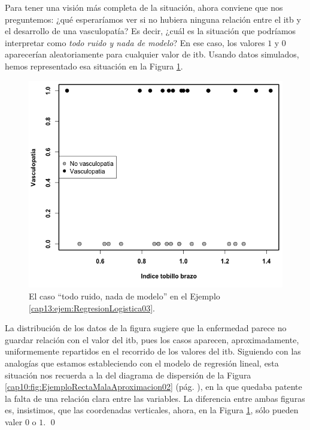 \begin{ejemplo}
Para tener una visión más completa de la situación, ahora conviene que nos preguntemos: ¿qué esperaríamos ver si no hubiera ninguna relación entre el itb y el desarrollo de una vasculopatía? Es decir, ¿cuál es la situación que podríamos interpretar como {\em todo ruido y nada de modelo}? En ese caso, los valores $1$ y $0$ aparecerían aleatoriamente para cualquier valor de itb. Usando datos simulados, hemos representado esa situación en la Figura \ref{cap13:fig:RegresionLogisticaNoRelacion}.
\begin{figure}[h!]
\begin{center}
    \includegraphics[width=13cm]{../fig/Cap13-VasculopatiaNoRel.png}
\end{center}
\caption{El caso ``todo ruido, nada de modelo'' en el Ejemplo \ref{cap13:ejem:RegresionLogistica03}.}
\label{cap13:fig:RegresionLogisticaNoRelacion}
\end{figure}
La distribución de los datos de la figura sugiere que la enfermedad parece no guardar relaci\'on con el valor del itb, pues los casos aparecen, aproximadamente, uniformemente repartidos en el recorrido de los valores del itb. Siguiendo con las analogías que estamos estableciendo con el modelo de regresión lineal, esta situación nos recuerda a la del diagrama de dispersión de la Figura \ref{cap10:fig:EjemploRectaMalaAproximacion02} (pág. \pageref{cap10:fig:EjemploRectaMalaAproximacion02}), en la que quedaba patente la falta de una relación clara entre las variables. La diferencia entre ambas figuras es, insistimos, que las coordenadas verticales, ahora, en la Figura \ref{cap13:fig:RegresionLogisticaNoRelacion}, sólo pueden valer $0$ o $1$.
\qed
\end{ejemplo}

